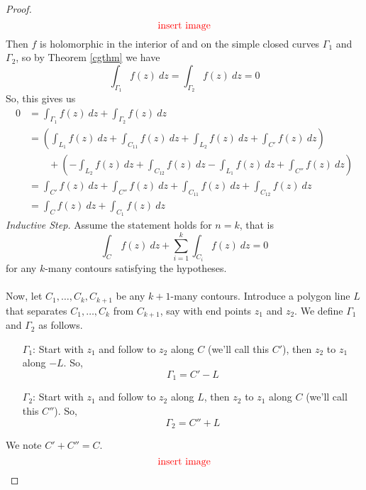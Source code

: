 \begin{proof}
\[\text{\color{red} insert image}\]
Then $f$ is holomorphic in the interior of and on the simple closed curves $\Gamma_1$ and $\Gamma_2$, so by Theorem \ref{cgthm} we have
\[\int_{\Gamma_1}f(z)\ dz = \int_{\Gamma_2}f(z)\ dz = 0\]
So, this gives us
\begin{align*}
0 &= \int_{\Gamma_1}f(z)\ dz + \int_{\Gamma_2}f(z)\ dz\\[1em]
 &= \left(\int_{L_1}f(z)\ dz + \int_{C_{11}}f(z)\ dz + \int_{L_2}f(z)\ dz + \int_{C'}f(z)\ dz\right)\\[1em]
 &\qquad + \left(-\int_{L_2}f(z)\ dz + \int_{C_{12}}f(z)\ dz - \int_{L_1}f(z)\ dz + \int_{C''}f(z)\ dz\right)\\[1em]
 &= \int_{C'}f(z)\ dz + \int_{C''}f(z)\ dz + \int_{C_{11}}f(z)\ dz + \int_{C_{12}}f(z)\ dz\\[1em]
 &= \int_{C}f(z)\ dz + \int_{C_1}f(z)\ dz
\end{align*}
\emph{Inductive Step.} Assume the statement holds for $n = k$, that is
\[\int_C\,f(z)\ dz + \sum_{i=1}^k\int_{C_i}f(z)\ dz = 0\]
for any $k$-many contours satisfying the hypotheses.\\
\\
Now, let $C_1,\ldots,C_k,C_{k+1}$ be any $k+1$-many contours. Introduce a polygon line $L$ that separates $C_1,\ldots,C_k$ from $C_{k+1}$, say with end points $z_1$ and $z_2$. We define $\Gamma_1$ and $\Gamma_2$ as follows.
\begin{itemize}
\item[$\Gamma_1$:] Start with $z_1$ and follow to $z_2$ along $C$ (we'll call this $C'$), then $z_2$ to $z_1$ along $-L$. So, 
\[\Gamma_1 = C' - L\]
\item[$\Gamma_2$:] Start with $z_1$ and follow to $z_2$ along $L$, then $z_2$ to $z_1$ along $C$ (we'll call this $C''$). So, 
\[\Gamma_2 = C'' + L\]
\end{itemize}
We note $C' + C'' = C$.
\[\text{\color{red}insert image}\]

\end{proof}
